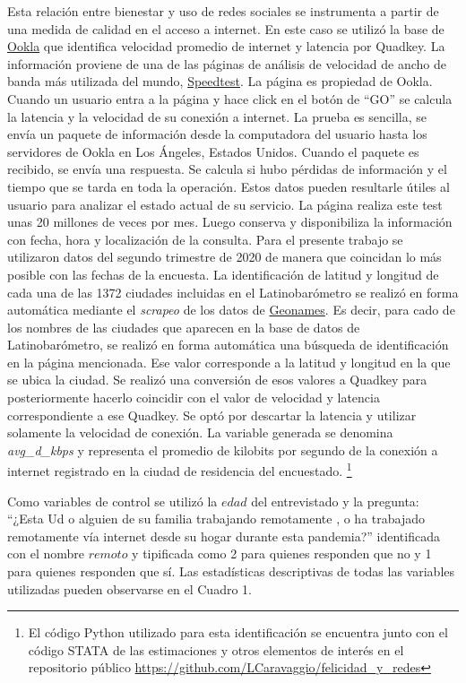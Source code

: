 \documentclass[11pt]{article}
\begin{document}
Esta relación entre bienestar y uso de redes sociales se instrumenta a partir de una medida de calidad en el acceso a internet. En este caso se utilizó la base de \href{https://www.ookla.com/ookla-for-good/open-data}{Ookla} que identifica velocidad promedio de internet y latencia por Quadkey. La información proviene de una de las páginas de análisis de velocidad de ancho de banda más utilizada del mundo, \href{https://www.speedtest.net/}{Speedtest}. La página es propiedad de Ookla. Cuando un usuario entra a la página y hace click en el botón de ``GO'' se calcula la latencia y la velocidad de su conexión a internet. La prueba es sencilla, se envía un paquete de información desde la computadora del usuario hasta los servidores de Ookla en Los Ángeles, Estados Unidos. Cuando el paquete es recibido, se envía una respuesta. Se calcula si hubo pérdidas de información y el tiempo que se tarda en toda la operación. Estos datos pueden resultarle útiles al usuario para analizar el estado actual de su servicio. La página realiza este test unas 20 millones de veces por mes. Luego conserva y disponibiliza la información con fecha, hora y localización de la consulta. Para el presente trabajo se utilizaron datos del segundo trimestre de 2020 de manera que coincidan lo más posible con las fechas de la encuesta. La identificación de latitud y longitud de cada una de las 1372 ciudades incluidas en el Latinobarómetro se realizó en forma automática mediante el \textit{scrapeo} de los datos de \href{http://www.geonames.org}{Geonames}. Es decir, para cado de los nombres de las ciudades que aparecen en la base de datos de Latinobarómetro, se realizó en forma automática una búsqueda de identificación en la página mencionada. Ese valor corresponde a la latitud y longitud en la que se ubica la ciudad. Se realizó una conversión de esos valores a Quadkey para posteriormente hacerlo coincidir con el valor de velocidad y latencia correspondiente a ese Quadkey. Se optó por descartar la latencia y utilizar solamente la velocidad de conexión. La variable generada se denomina \textit{avg\_d\_kbps} y representa el promedio de kilobits por segundo de la conexión a internet registrado en la ciudad de residencia del encuestado. \footnote{El código Python utilizado para esta identificación se encuentra junto con el código STATA de las estimaciones y otros elementos de interés en el repositorio público \url{https://github.com/LCaravaggio/felicidad_y_redes}}

Como variables de control se utilizó la $edad$ del entrevistado y la pregunta: ``¿Esta Ud o alguien de su familia trabajando remotamente , o ha trabajado remotamente vía internet desde su hogar durante esta pandemia?'' identificada con el nombre $remoto$ y tipificada como 2 para quienes responden que no y 1 para quienes responden que sí. Las estadísticas descriptivas de todas las variables utilizadas pueden observarse en el Cuadro 1. 
\end{document}
